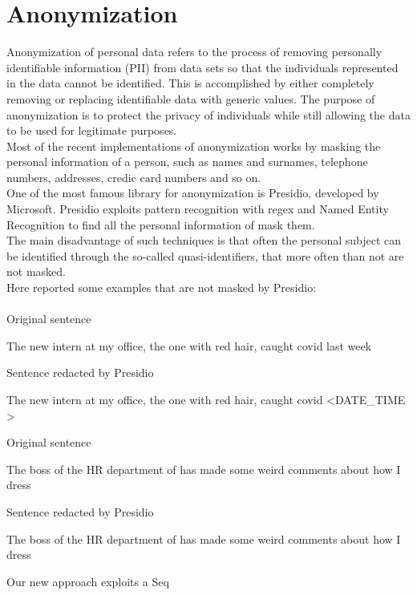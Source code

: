 \section{Anonymization}

Anonymization of personal data refers to the process of removing personally identifiable information (PII) from data sets so that the individuals represented in the data cannot be identified. This is accomplished by either completely removing or replacing identifiable data with generic values. The purpose of anonymization is to protect the privacy of individuals while still allowing the data to be used for legitimate purposes. \\
Most of the recent implementations of anonymization works by masking the personal information of a person, such as names and surnames, telephone numbers, addresses, credic card numbers and so on. \\
One of the most famous library for anonymization is Presidio, developed by Microsoft. Presidio exploits pattern recognition with regex and Named Entity Recognition to find all the personal information of mask them. \\
The main disadvantage of such techniques is that often the personal subject can be identified through the so-called quasi-identifiers, that more often than not are not masked.
\\Here reported some examples that are not masked by Presidio:\\ \\
Original sentence
\begin{adjustwidth}{1cm}{}
    The new intern at my office, the one with red hair, caught covid last week 
\end{adjustwidth}
Sentence redacted by Presidio
\begin{adjustwidth}{1cm}{}
    The new intern at my office, the one with red hair, caught covid \textless DATE\_TIME \textgreater
\end{adjustwidth}
Original sentence
\begin{adjustwidth}{1cm}{}
    The boss of the HR department of has made some weird comments about how I dress
\end{adjustwidth}
Sentence redacted by Presidio
\begin{adjustwidth}{1cm}{}
    The boss of the HR department of has made some weird comments about how I dress 
\end{adjustwidth}

Our new approach exploits a Seq

